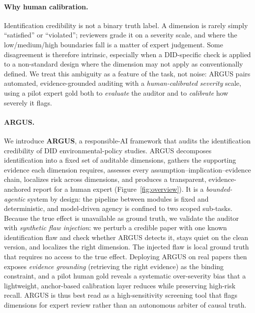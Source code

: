 \paragraph{Why human calibration.}
Identification credibility is not a binary truth label. A dimension is rarely
simply ``satisfied'' or ``violated''; reviewers grade it on a severity scale, and
where the low/medium/high boundaries fall is a matter of expert judgement. Some
disagreement is therefore intrinsic, especially when a DID-specific check is
applied to a non-standard design where the dimension may not apply as
conventionally defined. We treat this ambiguity as a feature of the task, not
noise: ARGUS pairs automated, evidence-grounded auditing with a
\emph{human-calibrated severity} scale, using a pilot expert gold both to
\emph{evaluate} the auditor and to \emph{calibrate} how severely it flags.

\paragraph{ARGUS.}
We introduce \textbf{ARGUS}, a responsible-AI framework that audits the
identification credibility of DID environmental-policy studies. ARGUS decomposes
identification into a fixed set of auditable dimensions, gathers the supporting
evidence each dimension requires, assesses every
assumption--implication--evidence chain, localizes risk across dimensions, and
produces a transparent, evidence-anchored report for a human expert
(Figure~\ref{fig:overview}). It is a \emph{bounded-agentic} system by design: the
pipeline between modules is fixed and deterministic, and model-driven agency is
confined to two scoped sub-tasks. Because the true effect is unavailable as ground truth, we validate
the auditor with \emph{synthetic flaw injection}: we perturb a credible paper
with one known identification flaw and check whether ARGUS detects it, stays
quiet on the clean version, and localizes the right dimension. The injected flaw
is local ground truth that requires no access to the true effect. Deploying ARGUS
on real papers then exposes \emph{evidence grounding} (retrieving the right
evidence) as the binding constraint, and a pilot human gold reveals a systematic
over-severity bias that a lightweight, anchor-based calibration layer reduces
while preserving high-risk recall. ARGUS is thus best read as a high-sensitivity
screening tool that flags dimensions for expert review rather than an autonomous
arbiter of causal truth.

